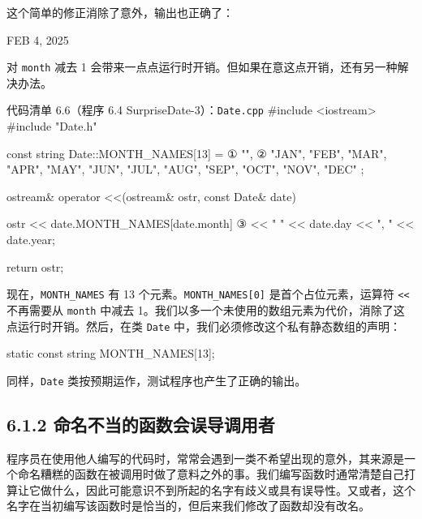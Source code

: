 这个简单的修正消除了意外，输出也正确了：

\begin{codebox}
FEB 4, 2025
\end{codebox}

对 \texttt{month} 减去 1 会带来一点点运行时开销。但如果在意这点开销，还有另一种解决办法。

\begin{codeboxt}{代码清单 6.6（程序 6.4 SurpriseDate-3）：\texttt{Date.cpp}}
#include <iostream>
#include "Date.h"

const string Date::MONTH_NAMES[13] =                  ①
{
    "",                                               ②
    "JAN", "FEB", "MAR", "APR", "MAY", "JUN",
    "JUL", "AUG", "SEP", "OCT", "NOV", "DEC"
};

ostream& operator <<(ostream& ostr, const Date& date)
{
    ostr << date.MONTH_NAMES[date.month]              ③
         << " " << date.day << ", " << date.year;

    return ostr;
}
\end{codeboxt}
\par
{}\par
{}\par

现在，\texttt{MONTH\_\allowbreak{}NAMES} 有 13 个元素。\texttt{MONTH\_\allowbreak{}NAMES[0]} 是首个占位元素，运算符 \texttt{<<} 不再需要从 \texttt{month} 中减去 1。我们以多一个未使用的数组元素为代价，消除了这点运行时开销。然后，在类 \texttt{Date} 中，我们必须修改这个私有静态数组的声明：

\begin{codebox}
    static const string MONTH_NAMES[13];
\end{codebox}

同样，\texttt{Date} 类按预期运作，测试程序也产生了正确的输出。

\subsection{6.1.2 命名不当的函数会误导调用者}

程序员在使用他人编写的代码时，常常会遇到一类不希望出现的意外，其来源是一个命名糟糕的函数在被调用时做了意料之外的事。我们编写函数时通常清楚自己打算让它做什么，因此可能意识不到所起的名字有歧义或具有误导性。又或者，这个名字在当初编写该函数时是恰当的，但后来我们修改了函数却没有改名。

